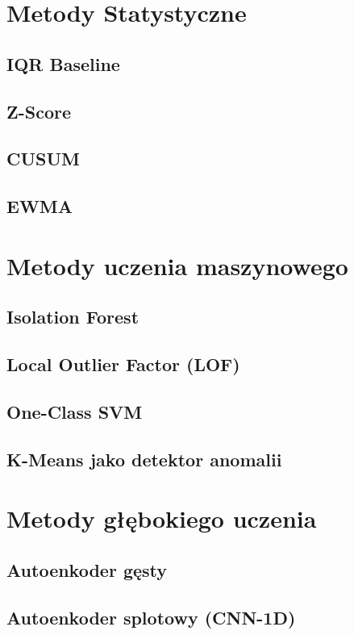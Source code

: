 \documentclass[a4paper,twoside,12pt]{book}
\begin{document}
\section{Metody Statystyczne}
\subsection{IQR Baseline}
\subsection{Z-Score}
\subsection{CUSUM}
\subsection{EWMA}

\section{Metody uczenia maszynowego}
\subsection{Isolation Forest}
\subsection{Local Outlier Factor (LOF)}
\subsection{One-Class SVM}
\subsection{K-Means jako detektor anomalii}

\section{Metody głębokiego uczenia}

\subsection{Autoenkoder gęsty}
\subsection{Autoenkoder splotowy (CNN-1D)}
\end{document}
